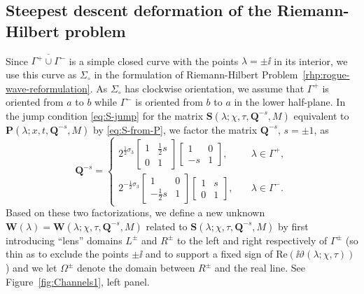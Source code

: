 \subsection{Steepest descent deformation of the Riemann-Hilbert problem}
Since $\overline{\Gamma^+\cup\Gamma^-}$ is a simple closed curve with the points $\lambda=\pm\ii$ in its interior, we use this curve as $\Sigma_\circ$ in the formulation of Riemann-Hilbert Problem~\ref{rhp:rogue-wave-reformulation}.  As $\Sigma_\circ$ has clockwise orientation, we assume that $\Gamma^+$ is oriented from $a$ to $b$ while $\Gamma^-$ is oriented from $b$ to $a$ in the lower half-plane. In the jump condition \eqref{eq:S-jump} for the matrix $\mathbf{S}(\lambda;\chi,\tau,\mathbf{Q}^{-s},M)$ equivalent to $\mathbf{P}(\lambda;x,t,\mathbf{Q}^{-s},M)$ by \eqref{eq:S-from-P}, we factor the matrix $\mathbf{Q}^{-s}$, $s=\pm 1$, as
\begin{equation}
\mathbf{Q}^{-s}=\begin{cases}
2^{\frac{1}{2}\sigma_3}\begin{bmatrix}1 & \tfrac{1}{2}s\\0 & 1\end{bmatrix}\begin{bmatrix}1 & 0\\-s & 1\end{bmatrix},\quad& \lambda\in\Gamma^+,\\
2^{-\frac{1}{2}\sigma_3}\begin{bmatrix}1 & 0\\-\tfrac{1}{2}s & 1\end{bmatrix}\begin{bmatrix}1 & s\\0 & 1\end{bmatrix},\quad& \lambda\in\Gamma^-.
\end{cases}
\label{eq:Q-factorizations}
\end{equation}
Based on these two factorizations, we define a new unknown $\mathbf{W}(\lambda)=\mathbf{W}(\lambda;\chi,\tau,\mathbf{Q}^{-s},M)$ related to $\mathbf{S}(\lambda;\chi,\tau,\mathbf{Q}^{-s},M)$ by first introducing ``lens'' domains $L^\pm$ and $R^\pm$ to the left and right respectively of $\Gamma^\pm$ (so thin as to exclude the points $\pm\ii$ and to support a fixed sign of $\mathrm{Re}(\ii\vartheta(\lambda;\chi,\tau))$) and we let $\Omega^\pm$ denote the domain between $R^\pm$ and the real line.  See Figure~\ref{fig:Channels1}, left panel.  
